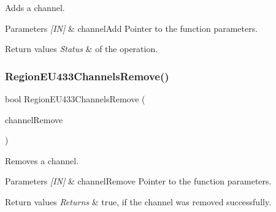 Adds a channel. 


\begin{DoxyParams}{Parameters}
{\em \mbox{[}\+I\+N\mbox{]}} & channel\+Add Pointer to the function parameters.\\
\hline
\end{DoxyParams}

\begin{DoxyRetVals}{Return values}
{\em Status} & of the operation. \\
\hline
\end{DoxyRetVals}
\mbox{\label{group__REGIONEU433_ga8c6f83d1c3aadcbc717551c3d4bc912e}} 
\subsubsection{\texorpdfstring{Region\+E\+U433\+Channels\+Remove()}{RegionEU433ChannelsRemove()}}
{\footnotesize\ttfamily bool Region\+E\+U433\+Channels\+Remove (\begin{DoxyParamCaption}\item[{\hyperlink{group__REGION_gaa37468560d2fc81a977b57a48e5d72c0}{Channel\+Remove\+Params\+\_\+t} $\ast$}]{channel\+Remove }\end{DoxyParamCaption})}



Removes a channel. 


\begin{DoxyParams}{Parameters}
{\em \mbox{[}\+I\+N\mbox{]}} & channel\+Remove Pointer to the function parameters.\\
\hline
\end{DoxyParams}

\begin{DoxyRetVals}{Return values}
{\em Returns} & true, if the channel was removed successfully. \\
\hline
\end{DoxyRetVals}
\mbox{\label{group__REGIONEU433_ga5e88bc1903bb61a90df88fe8c1805705}} 
